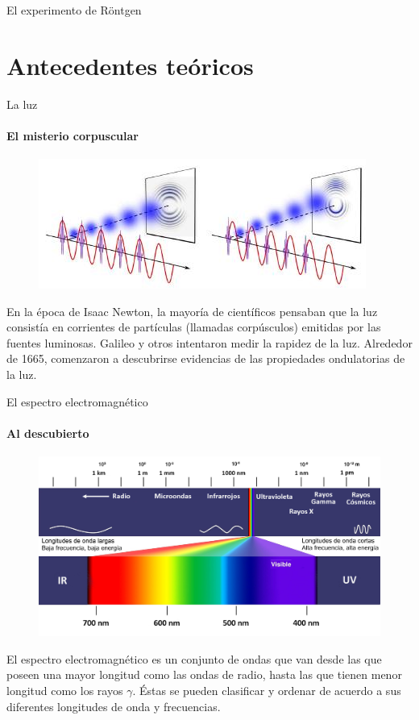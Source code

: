 \documentclass{beamer}
\begin{document}
\begin{darkframes}
\begin{frame}{El experimento de Röntgen}
\begin{multicols}{2}
     
     \end{multicols}

    \end{frame}
    
    
    \section{Antecedentes te\'oricos}
    \begin{frame}{La luz}
    \framesubtitle{El misterio corpuscular}
    \begin{figure}
        \centering
        \includegraphics[width = 0.8 \linewidth]{resources/22.jpg}
    \end{figure}
    
    En la \'epoca de Isaac Newton, la mayor\'ia de cient\'ificos pensaban que la luz consist\'ia en corrientes de part\'iculas (llamadas corp\'usculos) emitidas por las fuentes luminosas. Galileo y otros intentaron medir la rapidez de la luz. 
    Alrededor de 1665, comenzaron a descubrirse evidencias de las propiedades ondulatorias de la luz.
    
    \end{frame}
    
    
    \begin{frame}{El espectro electromagn\'etico}
    \framesubtitle{Al descubierto}
    
    \begin{figure}
        \centering
        \includegraphics[width = 0.65 \linewidth]{resources/23.png}
    \end{figure}
    
    El espectro electromagn\'etico es un conjunto de ondas que van desde las que poseen una mayor longitud como las ondas de radio, hasta las que tienen menor longitud como los rayos $\gamma$. \'Estas se pueden clasificar y ordenar de acuerdo a sus diferentes longitudes de onda y frecuencias.
    

\end{frame}
\end{darkframes}
\end{document}

